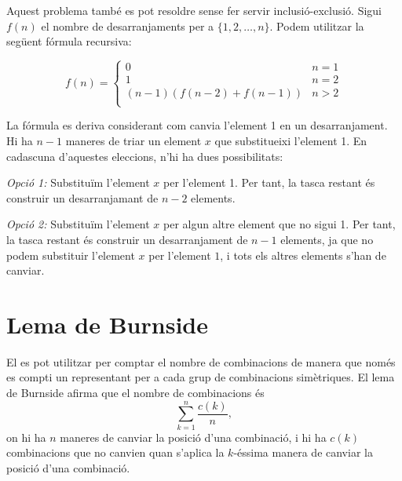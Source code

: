 Aquest problema també es pot resoldre sense fer servir
inclusió-exclusió. Sigui $f(n)$ el nombre de desarranjaments per a
$\{1,2,\ldots,n\}$. Podem utilitzar la següent fórmula recursiva:


\begin{equation*}
    f(n) = \begin{cases}
               0               & n = 1\\
               1               & n = 2\\
               (n-1)(f(n-2) + f(n-1)) & n>2 \\
           \end{cases}
\end{equation*}


La fórmula es deriva considerant com canvia l'element 1 en un desarranjament.
Hi ha $n-1$ maneres de triar un element $x$ que substitueixi l'element 1.
En cadascuna d'aquestes eleccions, n'hi ha dues possibilitats:

\textit{Opció 1:} Substituïm l'element $x$ per l'element 1. Per
tant, la tasca restant és construir un desarranjamant de $n-2$ elements.

\textit{Opció 2:} Substituïm l'element $x$ per algun altre element que
no sigui 1.  Per tant, la tasca restant és construir un desarranjament
de $n-1$ elements, ja que no podem substituir l'element $x$ per
l'element $1$, i tots els altres elements s'han de canviar.

\section{Lema de Burnside}


El  %
es pot utilitzar per comptar el nombre de combinacions de manera que
només es compti un representant per a cada grup de combinacions
simètriques. El lema de Burnside afirma que el nombre de combinacions
és
\[\sum_{k=1}^n \frac{c(k)}{n},\]
on hi ha $n$ maneres de canviar la posició d'una combinació, i hi ha
$c(k)$ combinacions que no canvien quan s'aplica la $k$-éssima manera de canviar
la posició d'una combinació.

